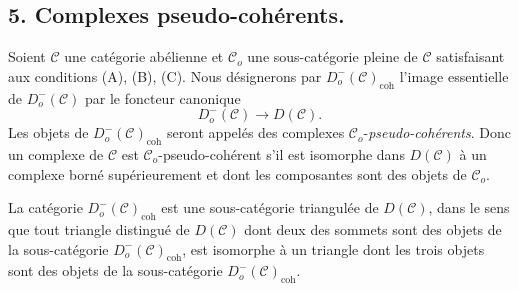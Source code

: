 \documentclass[11pt]{article}
\providecommand{\coh}{\mathrm{coh}}
\providecommand{\cC}{\mathcal C}
\providecommand{\cC}{\mathcal C}
\providecommand{\coh}{\mathrm{coh}}
\begin{document}
\subsection*{5. Complexes pseudo-cohérents.}

Soient $\cC$ une catégorie abélienne et $\cC_o$ une sous-catégorie pleine de $\cC$ satisfaisant aux conditions (A), (B), (C). Nous désignerons par $D_o^-(\cC)_{\coh}$ l'image essentielle de $D_o^-(\cC)$ par le foncteur canonique
\[
D_o^-(\cC)\longrightarrow D(\cC).
\]
Les objets de $D_o^-(\cC)_{\coh}$ seront appelés des complexes $\cC_o$-\emph{pseudo-cohérents}. Donc un complexe de $\cC$ est $\cC_o$-pseudo-cohérent s'il est isomorphe dans $D(\cC)$ à un complexe borné supérieurement et dont les composantes sont des objets de $\cC_o$.

La catégorie $D_o^-(\cC)_{\coh}$ est une sous-catégorie triangulée de $D(\cC)$, dans le sens que tout triangle distingué de $D(\cC)$ dont deux des sommets sont des objets de la sous-catégorie $D_o^-(\cC)_{\coh}$, est isomorphe à un triangle dont les trois objets sont des objets de la sous-catégorie $D_o^-(\cC)_{\coh}$.
\end{document}
